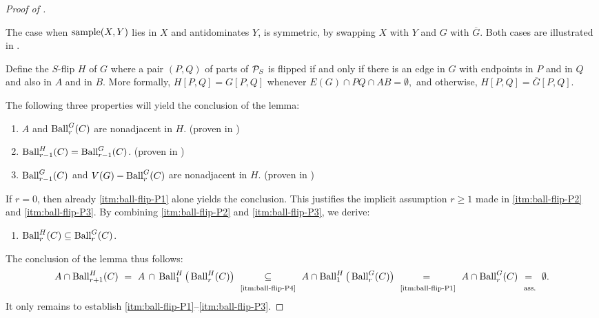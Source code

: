 \begin{proof}[Proof of ]
\begin{claimproof}
The case when $\sample(X,Y)$ lies in $X$ and antidominates $Y$, is symmetric, by swapping $X$ with $Y$ and $G$ with $\overline G$.
    Both cases are illustrated in .
    \end{claimproof}
    \begin{center}
        \captionsetup{type=figure}
        
        \caption{%
            Left: the forbidden configuration~\eqref{eq:ball-flip-crossing}.
            Middle: the case of the proof of  where $\sample(X,Y)$ (marked in blue) lies in $Y$. 
            Right: the case where $\sample(X,Y)$ lies in $X$.}
        \label{fig:ball-flip-crossing}
    \end{center}

    Define the $S$-flip $H$ of $G$ where a pair $(P,Q)$ of parts of $\mathcal P_S$ is flipped if and only if there is an edge in $G$ with endpoints in $P$ and in $Q$ and also in $A$ and in $B$. More formally, $H[P,Q]=G[P,Q]$ whenever
    $E(G) \cap PQ \cap AB = %
    \emptyset,$
    and otherwise, $H[P,Q]=\overline G[P,Q]$.
    

    The following three properties will yield the conclusion of the lemma:
    \begin{enumerate}[label=(P\arabic*), ref=P\arabic*]
        \item\label{itm:ball-flip-P1} $A$ and $\operatorname{Ball}_{r}^G(C) $ are nonadjacent in $H$.
        \hfill (proven in )
        \item\label{itm:ball-flip-P2} $\operatorname{Ball}_{r-1}^H(C)=\operatorname{Ball}_{r-1}^G(C)$.
        \hfill (proven in )
        \item\label{itm:ball-flip-P3}$\operatorname{Ball}_{r-1}^G(C)$ and $V(G) - \operatorname{Ball}_{r}^G(C)$ are nonadjacent in $H$.
        \hfill (proven in )
    \end{enumerate}
    If $r = 0$, then already \ref{itm:ball-flip-P1} alone yields the conclusion. This justifies the implicit assumption $r \geq 1$ made in  \ref{itm:ball-flip-P2} and \ref{itm:ball-flip-P3}.
    By combining \ref{itm:ball-flip-P2} and \ref{itm:ball-flip-P3}, we derive:
    \begin{enumerate}[label=(P\arabic*), ref=P\arabic*,start = 4]
        \item\label{itm:ball-flip-P4}  $\operatorname{Ball}_{r}^H(C) \subseteq \operatorname{Ball}_{r}^G(C)$.
    \end{enumerate}
    The conclusion of the lemma thus follows:
    \[
       A \cap \Ball_{r+1}^H(C)
       \  
    =
    \ 
       A \,\cap\, \Ball_1^H\big(\Ball_r^H(C)\big)
       \  \underset{\rule{0pt}{8pt}\text{\ref{itm:ball-flip-P4}}}{\subseteq} \ 
       A \cap \Ball_1^H\big(\Ball_r^G(C)\big)
       \  \underset{\rule{0pt}{8pt}\text{\ref{itm:ball-flip-P1}}}{=\vphantom{\subseteq}} \ 
       A \cap \Ball_r^G(C)
       \  \underset{\rule{0pt}{8pt}\text{ass.}}{=\vphantom{\subseteq}} \ 
       \emptyset.
    \]
    It only remains to establish \ref{itm:ball-flip-P1}--\ref{itm:ball-flip-P3}.
    



\end{proof}
